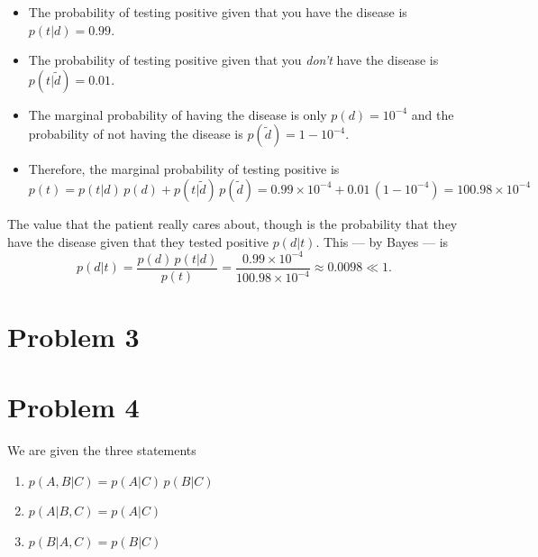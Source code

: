 \documentclass[11pt]{article}
\newcommand{\pr}[1]{\ensuremath{p(#1)}}
\newcommand{\no}[1]{\ensuremath{\tilde{#1}}}
\begin{document}
\begin{itemize}

    \item{The probability of testing positive given that you have the disease
        is $\pr{t|d} = 0.99$.}
    \item{The probability of testing positive given that you \emph{don't}
        have the disease is $\pr{t|\no{d}} = 0.01$.}
    \item{The marginal probability of having the disease is only
        $\pr{d} = 10^{-4}$ and the probability of not having the disease
        is $\pr{\no{d}} = 1-10^{-4}$.}
    \item{Therefore, the marginal probability of testing positive is
        \begin{equation}
            \pr{t} = \pr{t|d} \, \pr{d} + \pr{t|\no{d}} \, \pr{\no{d}}
                   = 0.99 \times 10^{-4} + 0.01 \, (1-10^{-4})
                   = 100.98 \times 10^{-4}
        \end{equation}
    }

\end{itemize}

\noindent The value that the patient really cares about, though is the
probability that they have the disease given that they tested positive
\pr{d | t}. This --- by Bayes --- is
\begin{equation}
    \pr{d | t} = \frac{\pr{d} \, \pr{t | d}}{\pr{t}}
               = \frac{0.99 \times 10^{-4}}{100.98 \times 10^{-4}}
               \approx 0.0098 \ll 1.
\end{equation}

\section{Problem 3}

\section{Problem 4}

We are given the three statements

\begin{enumerate}
    \item{\label{s1}$\pr{A,B|C} = \pr{A|C}\,\pr{B|C}$}
    \item{\label{s2}$\pr{A|B,C} = \pr{A|C}$}
    \item{\label{s3}$\pr{B|A,C} = \pr{B|C}$}
\end{enumerate}
\end{document}
